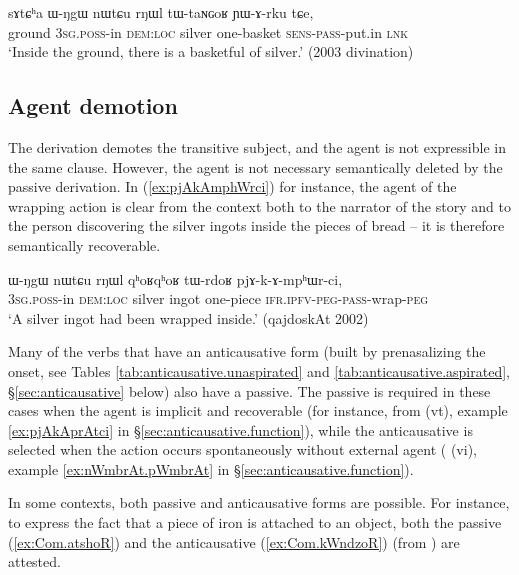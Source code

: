 \begin{exe}
\ex \label{ex:tWtaNGoR.YArku}
 \gll sɤtɕʰa ɯ-ŋgɯ nɯtɕu rŋɯl tɯ-taɴɢoʁ ɲɯ-ɤ-rku tɕe, \\
 ground \textsc{3sg}.\textsc{poss}-in \textsc{dem}:\textsc{loc} silver  one-basket \textsc{sens}-\textsc{pass}-put.in \textsc{lnk} \\
\glt `Inside the ground, there is a basketful of silver.' (2003 divination)
\end{exe} 

\subsection{Agent demotion} \label{sec:passive.agent}
The  derivation demotes the transitive subject, and the agent is not expressible in the same clause. However, the agent is not necessary semantically deleted by the passive derivation. In (\ref{ex:pjAkAmphWrci}) for instance, the agent of the wrapping action is clear from the context both to the narrator of the story and to the person discovering the silver ingots inside the pieces of bread -- it is therefore semantically recoverable.

\begin{exe}
\ex \label{ex:pjAkAmphWrci}
 \gll ɯ-ŋgɯ nɯtɕu rŋɯl qʰoʁqʰoʁ tɯ-rdoʁ pjɤ-k-ɤ-mpʰɯr-ci, \\
 \textsc{3sg}.\textsc{poss}-in \textsc{dem}:\textsc{loc} silver ingot one-piece \textsc{ifr}.\textsc{ipfv}-\textsc{peg}-\textsc{pass}-wrap-\textsc{peg} \\
 \glt `A silver ingot had been wrapped inside.' (qajdoskAt 2002) 
\end{exe}

 
Many of the verbs that have an anticausative form (built by prenasalizing the onset, see Tables \ref{tab:anticausative.unaspirated} and \ref{tab:anticausative.aspirated}, §\ref{sec:anticausative} below) also have a passive. The passive is required in these cases when the agent is implicit and recoverable (for instance,  from  (vt), example \ref{ex:pjAkAprAtci} in §\ref{sec:anticausative.function}), while the anticausative is selected when the action occurs spontaneously without external agent ( (vi), example \ref{ex:nWmbrAt.pWmbrAt} in §\ref{sec:anticausative.function}).
 
 In some contexts, both passive and anticausative forms are possible. For instance, to express the fact that a piece of iron is attached to an object, both the passive  (\ref{ex:Com.atshoR}) and the anticausative   (\ref{ex:Com.kWndzoR}) (from 
) are attested.


